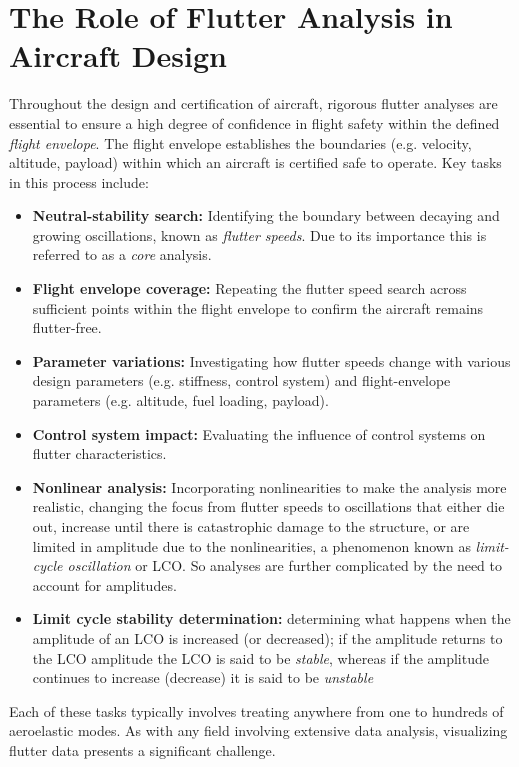 \documentclass[10pt,openany,twoside]{book}
\numberwithin{equation}{section}   %
\newcommand{\Newterm}[1]{{\em #1}}
\begin{document}
\section{The Role of Flutter Analysis in Aircraft Design}
Throughout the design and certification of aircraft, rigorous flutter analyses
are essential to ensure a high degree of confidence in flight safety within
the defined \Newterm{flight envelope}. The flight envelope
establishes the boundaries (e.g. velocity, altitude, payload) within which an
aircraft is certified safe to operate. Key tasks in this process include:
\begin{itemize}\label{sect:tasks}
	\item {\bf Neutral-stability search:}
			 Identifying the boundary between decaying and growing
			oscillations, known as \Newterm{flutter speeds}. Due to its
			importance this is referred to as a \Newterm{core} analysis.
	\item {\bf Flight envelope coverage:} Repeating the flutter speed search across sufficient
	      points within the flight envelope to confirm the aircraft remains flutter-free.
	\item {\bf Parameter variations:} Investigating how flutter speeds change with various
	     design parameters (e.g. stiffness, control system) and flight-envelope
		  parameters (e.g. altitude, fuel loading, payload).
	\item {\bf Control system impact:} Evaluating the influence of control systems on
	      flutter characteristics.
	\item {\bf Nonlinear analysis:} Incorporating nonlinearities to make the analysis more
			realistic, changing the focus from flutter speeds
			to oscillations that either die out, increase until there is catastrophic
			damage to the structure, or are limited in amplitude due to the nonlinearities,
	     a phenomenon known as \Newterm{limit-cycle oscillation} or LCO.
		 	So analyses are further complicated by the need to account for amplitudes.
	\item {\bf Limit cycle stability determination:}
			determining what happens when the amplitude of an LCO is increased (or decreased);
			if the amplitude returns to the LCO amplitude the LCO is said to be \emph{stable},
			whereas if the amplitude continues to increase (decrease) it is said to be \emph{unstable}
\end{itemize}
Each of these tasks typically involves treating anywhere from one to hundreds
of aeroelastic modes.  As with any field involving extensive data analysis,
visualizing flutter data presents a significant challenge.
\end{document}
